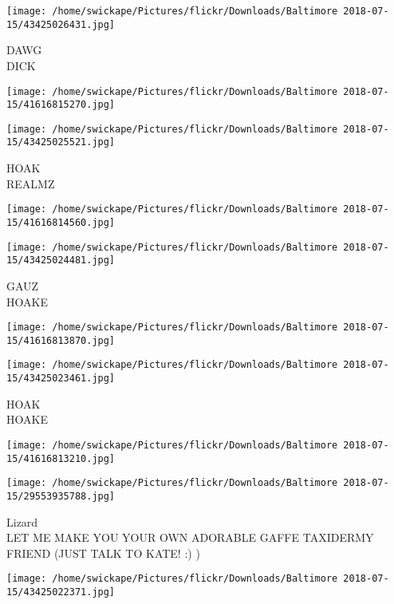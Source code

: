 \documentclass[10pt,letterpaper]{article}
\begin{document}
\vspace{0.25in}
\texttt{[image: /home/swickape/Pictures/flickr/Downloads/Baltimore 2018-07-15/43425026431.jpg]}

DAWG\\
DICK\\
\pagebreak

\texttt{[image: /home/swickape/Pictures/flickr/Downloads/Baltimore 2018-07-15/41616815270.jpg]}

\vspace{0.25in}
\texttt{[image: /home/swickape/Pictures/flickr/Downloads/Baltimore 2018-07-15/43425025521.jpg]}

HOAK\\
REALMZ\\
\pagebreak

\texttt{[image: /home/swickape/Pictures/flickr/Downloads/Baltimore 2018-07-15/41616814560.jpg]}

\vspace{0.25in}
\texttt{[image: /home/swickape/Pictures/flickr/Downloads/Baltimore 2018-07-15/43425024481.jpg]}

GAUZ\\
HOAKE\\
\pagebreak

\texttt{[image: /home/swickape/Pictures/flickr/Downloads/Baltimore 2018-07-15/41616813870.jpg]}

\vspace{0.25in}
\texttt{[image: /home/swickape/Pictures/flickr/Downloads/Baltimore 2018-07-15/43425023461.jpg]}

HOAK\\
HOAKE\\
\pagebreak

\texttt{[image: /home/swickape/Pictures/flickr/Downloads/Baltimore 2018-07-15/41616813210.jpg]}

\vspace{0.25in}
\texttt{[image: /home/swickape/Pictures/flickr/Downloads/Baltimore 2018-07-15/29553935788.jpg]}

Lizard\\
LET ME MAKE YOU YOUR OWN ADORABLE GAFFE TAXIDERMY FRIEND (JUST TALK TO KATE! :) )\\
\pagebreak

\texttt{[image: /home/swickape/Pictures/flickr/Downloads/Baltimore 2018-07-15/43425022371.jpg]}
\end{document}
